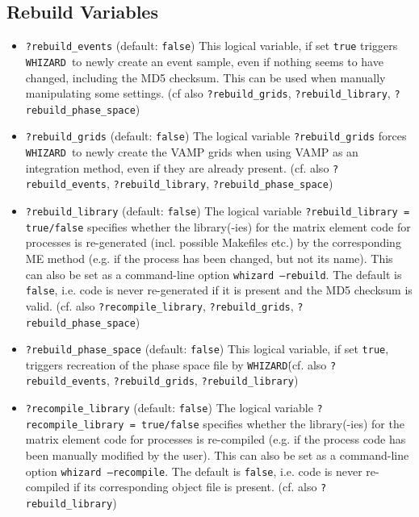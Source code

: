 \documentclass[12pt]{book}
\newcommand{\ttt}[1]{\texttt{#1}}
\newcommand{\whizard}{\ttt{WHIZARD}}
\begin{document}
\subsection{Rebuild Variables}
\begin{itemize}
\item
\ttt{?rebuild\_events} \qquad (default: \ttt{false}) \newline
This logical variable, if set \ttt{true} triggers \whizard\ to newly
create an event sample, even if nothing seems to have changed,
including the MD5 checksum. This can be used when manually
manipulating some settings. (cf also \ttt{?rebuild\_grids},
\ttt{?rebuild\_library}, \ttt{?rebuild\_phase\_space})
\item
\ttt{?rebuild\_grids} \qquad (default: \ttt{false}) \newline
The logical variable \ttt{?rebuild\_grids} forces \whizard\ to newly
create the VAMP grids when using VAMP as an integration method, even
if they are already present. (cf. also \ttt{?rebuild\_events},
\ttt{?rebuild\_library}, \ttt{?rebuild\_phase\_space})
\item
\ttt{?rebuild\_library} \qquad (default: \ttt{false}) \newline
The logical variable \ttt{?rebuild\_library = true/false} specifies
whether the library(-ies) for the matrix element code for processes is
re-generated (incl. possible Makefiles etc.) by the corresponding ME
method (e.g. if the process has been changed, but not its name). This
can also be set as a command-line option \ttt{whizard --rebuild}. The
default is \ttt{false}, i.e. code is never re-generated if it is
present and the MD5 checksum is valid.
(cf. also \ttt{?recompile\_library}, \ttt{?rebuild\_grids},
\ttt{?rebuild\_phase\_space})
\item
\ttt{?rebuild\_phase\_space} \qquad (default: \ttt{false}) \newline
This logical variable, if set \ttt{true}, triggers recreation of the
phase space file by \whizard\. (cf. also \ttt{?rebuild\_events},
\ttt{?rebuild\_grids}, \ttt{?rebuild\_library})
\item
\ttt{?recompile\_library} \qquad (default: \ttt{false}) \newline
The logical variable \ttt{?recompile\_library = true/false} specifies
whether the library(-ies) for the matrix element code for processes is
re-compiled (e.g. if the process code has been manually modified by
the user). This can also be set as a command-line option \ttt{whizard
  --recompile}. The default is \ttt{false}, i.e. code is never
re-compiled if its corresponding object file is present. (cf. also
\ttt{?rebuild\_library})
\end{itemize}
\end{document}
